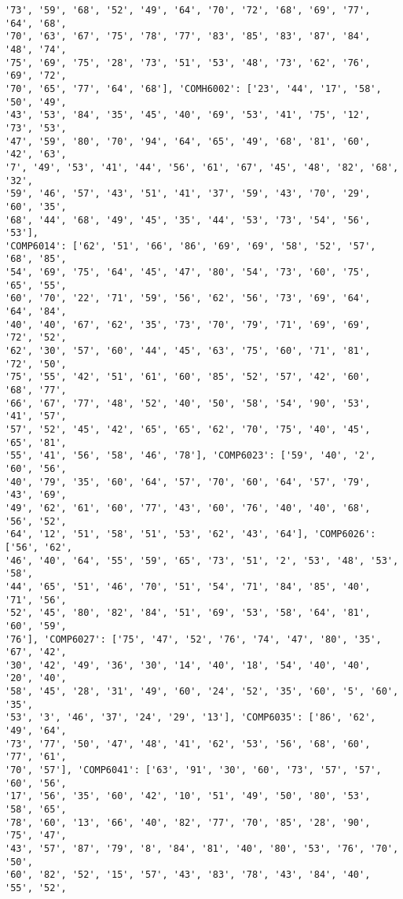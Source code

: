 \documentclass[11pt]{article}
\begin{document}
\begin{Verbatim}[commandchars=\\\{\}]
'73', '59', '68', '52', '49', '64', '70', '72', '68', '69', '77', '64', '68',
'70', '63', '67', '75', '78', '77', '83', '85', '83', '87', '84', '48', '74',
'75', '69', '75', '28', '73', '51', '53', '48', '73', '62', '76', '69', '72',
'70', '65', '77', '64', '68'], 'COMH6002': ['23', '44', '17', '58', '50', '49',
'43', '53', '84', '35', '45', '40', '69', '53', '41', '75', '12', '73', '53',
'47', '59', '80', '70', '94', '64', '65', '49', '68', '81', '60', '42', '63',
'7', '49', '53', '41', '44', '56', '61', '67', '45', '48', '82', '68', '32',
'59', '46', '57', '43', '51', '41', '37', '59', '43', '70', '29', '60', '35',
'68', '44', '68', '49', '45', '35', '44', '53', '73', '54', '56', '53'],
'COMP6014': ['62', '51', '66', '86', '69', '69', '58', '52', '57', '68', '85',
'54', '69', '75', '64', '45', '47', '80', '54', '73', '60', '75', '65', '55',
'60', '70', '22', '71', '59', '56', '62', '56', '73', '69', '64', '64', '84',
'40', '40', '67', '62', '35', '73', '70', '79', '71', '69', '69', '72', '52',
'62', '30', '57', '60', '44', '45', '63', '75', '60', '71', '81', '72', '50',
'75', '55', '42', '51', '61', '60', '85', '52', '57', '42', '60', '68', '77',
'66', '67', '77', '48', '52', '40', '50', '58', '54', '90', '53', '41', '57',
'57', '52', '45', '42', '65', '65', '62', '70', '75', '40', '45', '65', '81',
'55', '41', '56', '58', '46', '78'], 'COMP6023': ['59', '40', '2', '60', '56',
'40', '79', '35', '60', '64', '57', '70', '60', '64', '57', '79', '43', '69',
'49', '62', '61', '60', '77', '43', '60', '76', '40', '40', '68', '56', '52',
'64', '12', '51', '58', '51', '53', '62', '43', '64'], 'COMP6026': ['56', '62',
'46', '40', '64', '55', '59', '65', '73', '51', '2', '53', '48', '53', '58',
'44', '65', '51', '46', '70', '51', '54', '71', '84', '85', '40', '71', '56',
'52', '45', '80', '82', '84', '51', '69', '53', '58', '64', '81', '60', '59',
'76'], 'COMP6027': ['75', '47', '52', '76', '74', '47', '80', '35', '67', '42',
'30', '42', '49', '36', '30', '14', '40', '18', '54', '40', '40', '20', '40',
'58', '45', '28', '31', '49', '60', '24', '52', '35', '60', '5', '60', '35',
'53', '3', '46', '37', '24', '29', '13'], 'COMP6035': ['86', '62', '49', '64',
'73', '77', '50', '47', '48', '41', '62', '53', '56', '68', '60', '77', '61',
'70', '57'], 'COMP6041': ['63', '91', '30', '60', '73', '57', '57', '60', '56',
'17', '56', '35', '60', '42', '10', '51', '49', '50', '80', '53', '58', '65',
'78', '60', '13', '66', '40', '82', '77', '70', '85', '28', '90', '75', '47',
'43', '57', '87', '79', '8', '84', '81', '40', '80', '53', '76', '70', '50',
'60', '82', '52', '15', '57', '43', '83', '78', '43', '84', '40', '55', '52',

\end{Verbatim}
\end{document}
